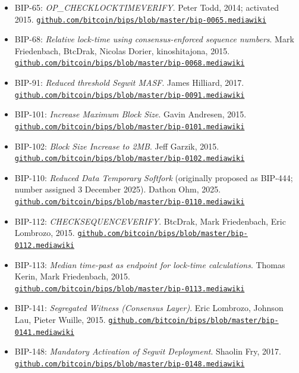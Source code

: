 \documentclass[11pt, twoside, openright]{book}
\begin{document}
\begin{itemize}[leftmargin=1.5em, itemsep=4pt]
  \item BIP-65: \textit{OP\_CHECKLOCKTIMEVERIFY}. Peter Todd, 2014; activated 2015. \href{https://github.com/bitcoin/bips/blob/master/bip-0065.mediawiki}{\nolinkurl{github.com/bitcoin/bips/blob/master/bip-0065.mediawiki}}
  \item BIP-68: \textit{Relative lock-time using consensus-enforced sequence numbers}. Mark Friedenbach, BtcDrak, Nicolas Dorier, kinoshitajona, 2015. \href{https://github.com/bitcoin/bips/blob/master/bip-0068.mediawiki}{\nolinkurl{github.com/bitcoin/bips/blob/master/bip-0068.mediawiki}}
  \item BIP-91: \textit{Reduced threshold Segwit MASF}. James Hilliard, 2017. \href{https://github.com/bitcoin/bips/blob/master/bip-0091.mediawiki}{\nolinkurl{github.com/bitcoin/bips/blob/master/bip-0091.mediawiki}}
  \item BIP-101: \textit{Increase Maximum Block Size}. Gavin Andresen, 2015. \href{https://github.com/bitcoin/bips/blob/master/bip-0101.mediawiki}{\nolinkurl{github.com/bitcoin/bips/blob/master/bip-0101.mediawiki}}
  \item BIP-102: \textit{Block Size Increase to 2MB}. Jeff Garzik, 2015. \href{https://github.com/bitcoin/bips/blob/master/bip-0102.mediawiki}{\nolinkurl{github.com/bitcoin/bips/blob/master/bip-0102.mediawiki}}
  \item BIP-110: \textit{Reduced Data Temporary Softfork} (originally proposed as BIP-444; number assigned 3 December 2025). Dathon Ohm, 2025. \href{https://github.com/bitcoin/bips/blob/master/bip-0110.mediawiki}{\nolinkurl{github.com/bitcoin/bips/blob/master/bip-0110.mediawiki}}
  \item BIP-112: \textit{CHECKSEQUENCEVERIFY}. BtcDrak, Mark Friedenbach, Eric Lombrozo, 2015. \href{https://github.com/bitcoin/bips/blob/master/bip-0112.mediawiki}{\nolinkurl{github.com/bitcoin/bips/blob/master/bip-0112.mediawiki}}
  \item BIP-113: \textit{Median time-past as endpoint for lock-time calculations}. Thomas Kerin, Mark Friedenbach, 2015. \href{https://github.com/bitcoin/bips/blob/master/bip-0113.mediawiki}{\nolinkurl{github.com/bitcoin/bips/blob/master/bip-0113.mediawiki}}
  \item BIP-141: \textit{Segregated Witness (Consensus Layer)}. Eric Lombrozo, Johnson Lau, Pieter Wuille, 2015. \href{https://github.com/bitcoin/bips/blob/master/bip-0141.mediawiki}{\nolinkurl{github.com/bitcoin/bips/blob/master/bip-0141.mediawiki}}
  \item BIP-148: \textit{Mandatory Activation of Segwit Deployment}. Shaolin Fry, 2017. \href{https://github.com/bitcoin/bips/blob/master/bip-0148.mediawiki}{\nolinkurl{github.com/bitcoin/bips/blob/master/bip-0148.mediawiki}}

\end{itemize}
\end{document}
